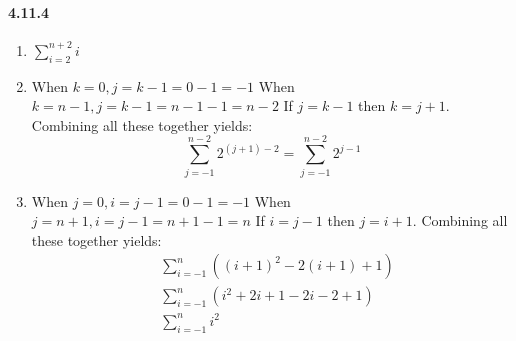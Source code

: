 \documentclass[11pt, letterpaper, twocolumn, fleqn]{article}
\begin{document}
    \paragraph{4.11.4}
        \begin{enumerate}
            \item $\sum_{i=2}^{n+2} i$
            \item When $k=0,  j=k-1=0-1=-1$ \newline
                  When $k=n-1,j=k-1=n-1-1=n-2$ \newline
                  If $j=k-1$ then $k=j+1$. Combining all these together yields:
                  $$\sum_{j=-1}^{n-2}2^{(j+1)-2} = \sum_{j=-1}^{n-2}2^{j-1}$$
            \item When $j=0,   i=j-1=0-1=-1$ \newline
                  When $j=n+1, i=j-1=n+1-1=n$ \newline
                  If $i=j-1$ then $j=i+1$. Combining all these together yields:
                  \begin{align*}
                   &\sum_{i=-1}^{n} ((i+1)^2 - 2(i+1) + 1) \\
                   &\sum_{i=-1}^{n} (i^2 +2i +1-2i-2+1) \\
                   &\sum_{i=-1}^{n} i^2
                  \end{align*}
        \end{enumerate}
    
\end{document}
